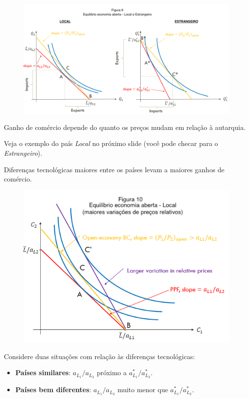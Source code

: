 \documentclass[a4paper,12pt]{article}[abntex2]
\begin{document}
\begin{figure}[H]
    \centering
    \includegraphics[width=0.7\linewidth]{Imagens/a9i11.png}
\end{figure}

Ganho de comércio depende do quanto os preços mudam em relação à autarquia.

Veja o exemplo do país \textit{Local} no próximo slide (você pode checar para o \textit{Estrangeiro}).

Diferenças tecnológicas maiores entre os países levam a maiores ganhos de comércio.

\begin{figure}[H]
    \centering
    \includegraphics[width=0.7\linewidth]{Imagens/a9i12.png}
\end{figure}

Considere duas situações com relação às diferenças tecnológicas:

\begin{itemize}
    \item \textbf{Países similares}: \( a_{L_1}/a_{L_2} \) próximo a \( a_{L_1}^*/a_{L_2}^* \).
    \item \textbf{Países bem diferentes}: \( a_{L_1}/a_{L_2} \) muito menor que \( a_{L_1}^*/a_{L_2}^* \).
\end{itemize}
\end{document}
